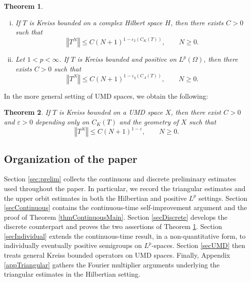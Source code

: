 \documentclass[12pt]{amsart}
\theoremstyle{plain}
\newtheorem{thm}{Theorem}[section]
\theoremstyle{remark}
\theoremstyle{definition}
\newcommand{\norm}[1]{\left\Vert #1\right\Vert}
\begin{document}
	\begin{thm}\label{thmDiscreteMain}
		\begin{enumerate}[(i)]
			\item
			If $T$ is Kreiss bounded on a complex Hilbert space $H$, then there exists $C>0$ such that
			\begin{equation*}\label{eqMainDiscreteH}
				\norm{T^N}
				\le
				C(N+1)^{1-\varepsilon_2(C_K(T))},
				\qquad N\ge 0.
			\end{equation*}
			
			\item
			Let $1<p<\infty$. If $T$ is Kreiss bounded and positive on $L^p(\Omega)$, then there exists $C>0$ such that
			\begin{equation*}\label{eqMainPositiveDiscrete}
				\norm{T^N}
				\le
				C(N+1)^{1-\varepsilon_q(C_A(T))},
				\qquad N\ge 0.
			\end{equation*}
		\end{enumerate}
	\end{thm}
	In the more general setting of UMD spaces, we obtain the following:
	\begin{thm}\label{thmUMD}
		If $T$ is Kreiss bounded on a UMD space $X$, then there
		exist $C>0$ and $\varepsilon>0$  depending only on $C_K(T)$ and the geometry of $X$ such that
		\begin{equation*}\label{eqMainUMDDiscrete}
			\norm{T^N}
			\le
			C(N+1)^{1-\varepsilon},
			\qquad N\ge0.
		\end{equation*}
		
	\end{thm}
	
	\subsection*{Organization of the paper}
	
	Section \ref{sec:prelim} collects the continuous and discrete preliminary estimates used throughout the paper. In particular, we record the triangular estimates and the upper orbit estimates in both the Hilbertian and positive $L^p$ settings. Section \ref{secContinuous} contains the continuous-time self-improvement argument and the proof of Theorem \ref{thmContinuousMain}. Section \ref{secDiscrete} develops the discrete counterpart and proves the  two assertions of Theorem \ref{thmDiscreteMain}. Section \ref{secIndividual} extends the continuous-time result, in a non-quantitative form, to individually eventually positive semigroups on $L^p$-spaces. Section \ref{secUMD} then treats general Kreiss bounded operators on UMD spaces. Finally, Appendix \ref{appTriangular} gathers the Fourier multiplier arguments underlying the triangular estimates in the Hilbertian setting.
	
\end{document}
